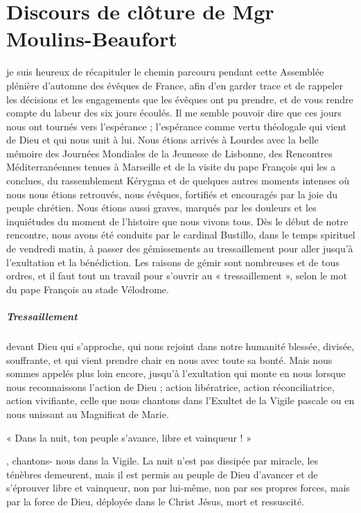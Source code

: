 \chapter{Discours de clôture de Mgr Moulins-Beaufort }

 

 je suis heureux de récapituler le chemin parcouru pendant cette Assemblée plénière d’automne des évêques de France, afin d’en garder trace et de rappeler les décisions et les engagements que les évêques ont pu prendre, et de vous rendre compte du labeur des six jours écoulés.
Il me semble pouvoir dire que ces jours nous ont tournés vers l’espérance ; l’espérance comme vertu théologale qui vient de Dieu et qui nous unit à lui. Nous étions arrivés à Lourdes avec la belle mémoire des Journées Mondiales de la Jeunesse de Lisbonne, des Rencontres Méditerranéennes tenues à Marseille et de la visite du pape François qui les a conclues, du rassemblement Kérygma et de quelques autres moments intenses où nous nous étions retrouvés, nous évêques, fortifiés et encouragés par la joie du peuple chrétien. Nous étions aussi graves, marqués par les douleurs et les inquiétudes du moment de l’histoire que nous vivons tous.
Dès le début de notre rencontre, nous avons été conduits par le cardinal Bustillo, dans le temps spirituel de vendredi matin, à passer des gémissements au tressaillement pour aller jusqu’à l’exultation et la bénédiction. Les raisons de gémir sont nombreuses et de tous ordres, et il faut tout un travail pour s’ouvrir au « tressaillement », selon le mot du pape François au stade Vélodrome. 


\paragraph{Tressaillement} devant Dieu qui s’approche, qui nous rejoint dans notre humanité blessée, divisée, souffrante, et qui vient prendre chair en nous avec toute sa bonté. Mais nous sommes appelés plus loin encore, jusqu’à l’exultation qui monte en nous lorsque nous reconnaissons l’action de Dieu ; action libératrice, action réconciliatrice, action vivifiante, celle que nous chantons dans l’Exultet de la Vigile pascale ou en nous unissant au Magnificat de Marie. 
\begin{singlequote}
    « Dans la nuit, ton peuple s’avance, libre et vainqueur ! »
\end{singlequote}, chantons- nous dans la Vigile. La nuit n’est pas dissipée par miracle, les ténèbres demeurent, mais il est permis au peuple de Dieu d’avancer et de s’éprouver libre et vainqueur, non par lui-même, non par ses propres forces, mais par la force de Dieu, déployée dans le Christ Jésus, mort et ressuscité.

